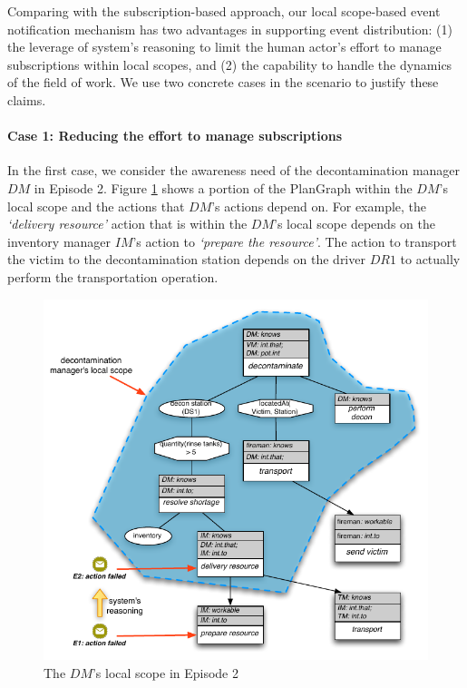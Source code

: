 Comparing with the subscription-based approach, our local scope-based event notification mechanism has two advantages in supporting event distribution: (1) the leverage of system's reasoning to limit the human actor's effort to manage subscriptions within local scopes, and (2) the capability to handle the dynamics of the field of work. We use two concrete cases in the scenario to justify these claims.

\paragraph*{Case 1: Reducing the effort to manage subscriptions} %
\label{par:case_1_reducing_the_effort_to_manage_subscriptions}
In the first case, we consider the awareness need of the decontamination manager $DM$ in Episode 2. Figure \ref{fig:case_1_dm} shows a portion of the PlanGraph within the $DM$'s local scope and the actions that $DM$'s actions depend on. For example, the \emph{`delivery resource'} action that is within the $DM$'s local scope depends on the inventory manager $IM$'s action to \emph{`prepare the resource'}. The action to transport the victim to the decontamination station depends on the driver $DR1$ to actually perform the transportation operation. 

\begin{figure}[htbp] %
	\centering
	\includegraphics{case_1_dm.pdf} 
	\caption{The $DM$'s local scope in Episode 2}
	\label{fig:case_1_dm}
\end{figure}

